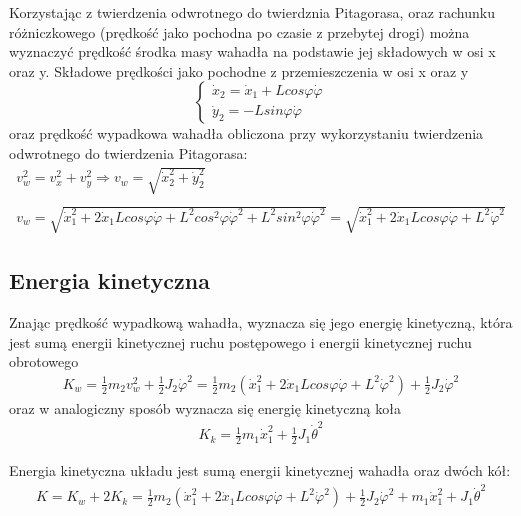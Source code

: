 Korzystając z twierdzenia odwrotnego do twierdznia Pitagorasa, oraz rachunku różniczkowego (prędkość jako pochodna po czasie z przebytej drogi) można wyznaczyć prędkość środka masy wahadła na podstawie jej składowych w osi x oraz y. Składowe prędkości jako pochodne z przemieszczenia w osi x oraz y
$$
    \left\{
    \begin{array}{c}
    \dot{x}_2 = \dot{x}_1 + Lcos\varphi\dot{\varphi} \\
    \dot{y}_2 = -Lsin\varphi\dot{\varphi}
    \end{array}
    \right.
$$
oraz prędkość wypadkowa wahadła obliczona przy wykorzystaniu twierdzenia odwrotnego do twierdzenia Pitagorasa:
\begin{equation}
    \begin{array}{ll}
    v_w^2 = v_x^2 + v_y^2 \Rightarrow v_w = \sqrt{\dot{x}_2^2 + \dot{y}_2^2} \\ \\
    v_w = \sqrt{\dot{x}_1^2 + 2\dot{x}_1Lcos\varphi\dot{\varphi} + L^2cos^2\varphi\dot{\varphi}^2 + L^2sin^2\varphi\dot{\varphi}^2} = \sqrt{\dot{x}_1^2 + 2\dot{x}_1Lcos\varphi\dot{\varphi} + L^2\dot{\varphi}^2}
    \end{array}
\end{equation}

\subsection{Energia kinetyczna}
Znając prędkość wypadkową wahadła, wyznacza się jego energię kinetyczną, która jest sumą energii kinetycznej ruchu postępowego i energii kinetycznej ruchu obrotowego
$$
    \begin{array}{ll}
    K_w = \frac{1}{2}m_2v_w^2 + \frac{1}{2}J_2\dot{\varphi}^2 = \frac{1}{2}m_2(\dot{x}_1^2 + 2\dot{x}_1Lcos\varphi\dot{\varphi} + L^2\dot{\varphi}^2) + \frac{1}{2}J_2\dot{\varphi}^2
    \end{array}
$$
oraz w analogiczny sposób wyznacza się energię kinetyczną koła
$$
    \begin{array}{ll}
    K_k = \frac{1}{2}m_1\dot{x}_1^2 + \frac{1}{2}J_1\dot{\theta}^2
    \end{array}
$$

Energia kinetyczna układu jest sumą energii kinetycznej wahadła oraz dwóch kół:
\begin{equation}
    \begin{array}{ll}
    K = K_w + 2K_k = \frac{1}{2}m_2(\dot{x}_1^2 + 2\dot{x}_1Lcos\varphi\dot{\varphi} + L^2\dot{\varphi}^2) + \frac{1}{2}J_2\dot{\varphi}^2 + m_1\dot{x}_1^2 + J_1\dot{\theta}^2
    \end{array}
\end{equation}

